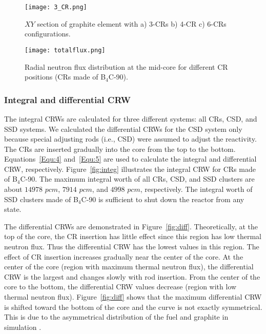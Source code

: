 \begin{figure}[!ht]
	\centering
	\texttt{[image: 3\_CR.png]}
	\vspace{-0.5in}
	\caption{$XY$ section of graphite element with a) 3-CRs b) 4-CR c) 6-CRs configurations.} 
	\label{fig:3_CR}
\end{figure}

\begin{figure}[!ht]
	\centering
	\texttt{[image: totalflux.png]}
	\vspace{-0.5in}
	\caption{Radial neutron flux distribution at the mid-core for different 
	CR positions (CRs made of B$_4$C-90).} 
	\label{fig:totalflux}
\end{figure}
 

\subsubsection{Integral and differential CRW}

The integral CRWs are calculated for three different systems: all CRs, CSD, and SSD systems. We calculated the differential CRWs for the CSD system only because special adjusting rods (i.e., CSD) were assumed to adjust the reactivity.
The CRs are inserted gradually into the core from the top to the bottom. 
Equations~\ref{Equ:4} and~\ref{Equ:5} are used to calculate the integral and 
differential CRW, respectively. Figure~\ref{fig:integ} illustrates the integral CRW for CRs 
made of B$_4$C-90. The maximum integral worth of all CRs, CSD, and SSD 
clusters are about $14978$ $pcm$, $7914$ $pcm$, and $4998$ $pcm$, respectively. The 
integral worth of SSD clusters made of B$_4$C-90 is sufficient to shut down the reactor from any 
state.

The differential CRWs are demonstrated in Figure~\ref{fig:diff}. Theoretically, at the top of the core, the CR insertion has little effect since this region has low thermal neutron flux. Thus the differential CRW has the lowest values in this region. The effect of CR insertion increases gradually near the center of the core. At the center of the core (region with maximum thermal neutron flux), the differential CRW is the largest and changes slowly with rod insertion. From the center of the core to the bottom, the differential CRW values decrease (region with low thermal neutron flux). Figure~\ref{fig:diff} shows that the maximum differential CRW is shifted toward the bottom of the core and the curve is not exactly symmetrical. This is due to the asymmetrical distribution of the fuel and graphite in simulation \cite{xuemei2013study,son2016control}.

